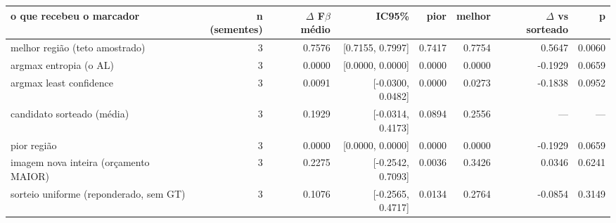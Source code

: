\begin{tabular}{lrrrrrrr}
\hline
o que recebeu o marcador & n (sementes) & $\Delta$ F$\beta$ médio & IC95\% & pior & melhor & $\Delta$ vs sorteado & p \\
\hline
melhor região (teto amostrado) & 3 & 0.7576 & [0.7155, 0.7997] & 0.7417 & 0.7754 & 0.5647 & 0.0060 \\
argmax entropia (o AL) & 3 & 0.0000 & [0.0000, 0.0000] & 0.0000 & 0.0000 & -0.1929 & 0.0659 \\
argmax least confidence & 3 & 0.0091 & [-0.0300, 0.0482] & 0.0000 & 0.0273 & -0.1838 & 0.0952 \\
candidato sorteado (média) & 3 & 0.1929 & [-0.0314, 0.4173] & 0.0894 & 0.2556 & --- & --- \\
pior região & 3 & 0.0000 & [0.0000, 0.0000] & 0.0000 & 0.0000 & -0.1929 & 0.0659 \\
imagem nova inteira (orçamento MAIOR) & 3 & 0.2275 & [-0.2542, 0.7093] & 0.0036 & 0.3426 & 0.0346 & 0.6241 \\
sorteio uniforme (reponderado, sem GT) & 3 & 0.1076 & [-0.2565, 0.4717] & 0.0134 & 0.2764 & -0.0854 & 0.3149 \\
\hline
\end{tabular}

